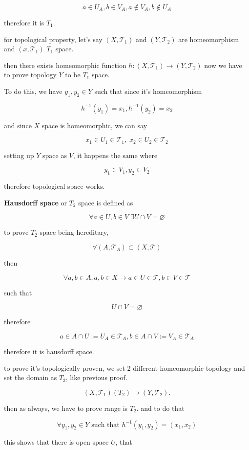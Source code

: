 \documentclass{article}
\begin{document}
\[
a\in U_A, b\in V_A, a\notin V_A, b\notin U_A
\]

therefore it is $T_1$.

for topological property, let's say $(X,\mathcal{T}_1)$ and $(Y,\mathcal{T}_2)$ are homeomorphism and $(x,\mathcal{T}_1)$ $T_1$ space.

then there exists homeomorphic function $h:(X,\mathcal{T}_1)\rightarrow (Y,\mathcal{T}_2)$ now we have to prove topology $Y$ to be $T_1$ space.

To do this, we have $y_1,y_2\in Y$ such that since it's homeomorphism 

\[
h^{-1}(y_1)=x_1, h^{-1}(y_2)=x_2
\]

and since $X$ space is homeomorphic, we can say

\[
x_1\in U_1\in \mathcal{T}_1, \; x_2\in U_2 \in \mathcal{T}_2
\]

setting up $Y$ space as $V$, it happens the same where

\[
y_1\in V_1, y_2\in V_2
\]

therefore topological space works.


\textbf{Hausdorff space} or $T_2$ space is defined as 

\[
\forall a\in U, b\in V \; \exists U\cap V=\varnothing
\]

to prove $T_2$ space being hereditary, 

\[
\forall (A,\mathcal{T}_A)\subset (X,\mathcal{T})
\]

then

\[
\forall a,b\in A, a,b\in X \rightarrow a\in U\in \mathcal{T}, b\in V\in \mathcal{T}
\]

such that

\[
U\cap V=\varnothing
\]

therefore

\[
a\in A\cap U:=U_A\in \mathcal{T}_A, b\in A\cap V:= V_A\in \mathcal{T}_A
\]

therefore it is hausdorff space.

to prove it's topologically proven, we set 2 different homeomorphic topology and set the domain as $T_2$, like previous proof.

\[
(X,\mathcal{T}_1)(T_2)\rightarrow (Y,\mathcal{T}_2).
\]

then as always, we have to prove range is $T_2$. and to do that

\[
\forall y_1,y_2\in Y \text{ such that } h^{-1}(y_1,y_2)=(x_1,x_2)
\]

this shows that there is open space $U$, that
\end{document}
